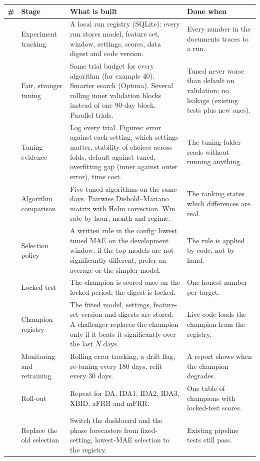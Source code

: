 \documentclass[11pt,a4paper]{article}
\begin{document}
\begin{longtable}{@{}>{\raggedright\arraybackslash}p{0.4cm}>{\raggedright\arraybackslash}p{3.0cm}>{\raggedright\arraybackslash}p{7.0cm}>{\raggedright\arraybackslash}p{4.4cm}@{}}
\toprule
\# & Stage & What is built & Done when \\
\midrule
\endhead
1 & Experiment tracking & A local run registry (SQLite): every run stores model, feature set, window, settings, scores,
data digest and code version. & Every number in the documents traces to a run. \\
2 & Fair, stronger tuning & Same trial budget for every algorithm (for example 40). Smarter search (Optuna). Several
rolling inner validation blocks instead of one 90-day block. Parallel trials. & Tuned never worse than default on
validation; no leakage (existing tests plus new ones). \\
3 & Tuning evidence & Log every trial. Figures: error against each setting, which settings matter, stability of choices
across folds, default against tuned, overfitting gap (inner against outer error), time cost. & The tuning folder reads
without running anything. \\
4 & Algorithm comparison & Five tuned algorithms on the same days. Pairwise Diebold--Mariano matrix with Holm correction.
Win rate by hour, month and regime. & The ranking states which differences are real. \\
5 & Selection policy & A written rule in the config: lowest tuned MAE on the development window; if the top models are not
significantly different, prefer an average or the simpler model. & The rule is applied by code, not by hand. \\
6 & Locked test & The champion is scored once on the locked period; the digest is locked. & One honest number per
target. \\
7 & Champion registry & The fitted model, settings, feature-set version and digests are stored. A challenger replaces the
champion only if it beats it significantly over the last $N$ days. & Live code loads the champion from the registry. \\
8 & Monitoring and retraining & Rolling error tracking, a drift flag, re-tuning every 180 days, refit every 30 days. & A
report shows when the champion degrades. \\
9 & Roll-out & Repeat for DA, IDA1, IDA2, IDA3, XBID, aFRR and mFRR. & One table of champions with locked-test
scores. \\
10 & Replace the old selection & Switch the dashboard and the phase forecasters from fixed-setting, lowest-MAE selection to
the registry. & Existing pipeline tests still pass. \\
\bottomrule
\end{longtable}
\end{document}
